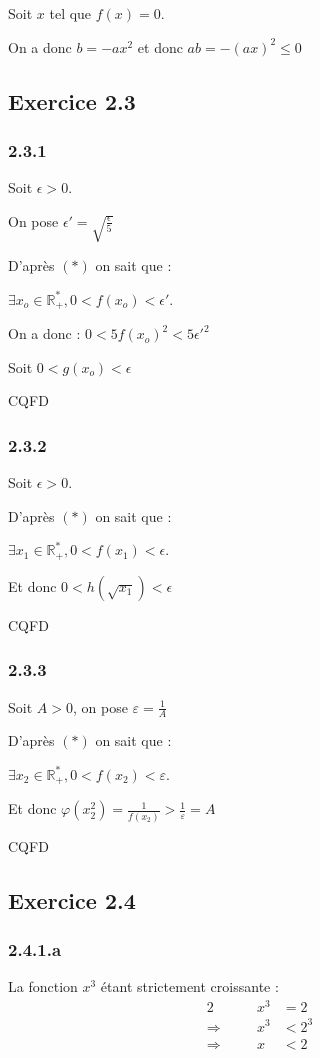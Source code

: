 \documentclass[a4paper,10pt]{report}
\begin{document}
Soit $x$ tel que $f(x) = 0$.

On a donc $b=-ax^2$ et donc $ab = -(ax)^2 \leq 0$


\subsection*{Exercice 2.3}
\subsubsection*{2.3.1}

Soit $\epsilon > 0$.

On pose $\epsilon' = \sqrt{\frac{\epsilon}{5}}$

D'après $(*)$ on sait que :

$\exists x_o \in \mathbb{R}^*_+, 0<f(x_o)<\epsilon'$.

On a donc : $0 < 5f(x_o)^2 < 5\epsilon'^2$

Soit $0 < g(x_o) < \epsilon$

CQFD

\subsubsection*{2.3.2}

Soit $\epsilon > 0$.

D'après $(*)$ on sait que :

$\exists x_1 \in \mathbb{R}^*_+, 0<f(x_1)<\epsilon$.

Et donc $0 < h(\sqrt{x_1}) < \epsilon$

CQFD

\subsubsection*{2.3.3}

Soit $A > 0$, on pose $\varepsilon = \frac{1}{A}$

D'après $(*)$ on sait que :

$\exists x_2 \in \mathbb{R}^*_+, 0<f(x_2)<\varepsilon$.

Et donc $\varphi(x_2^2) = \frac{1}{f(x_2)} > \frac{1}{\varepsilon} = A$

CQFD


\subsection*{Exercice 2.4}
\subsubsection*{2.4.1.a}
La fonction $x^3$ étant strictement croissante :
\begin{alignat*}{2}
	               &\quad & x^3 &=2 \\
	\Longrightarrow&      & x^3 &< 2^3 \\
	\Longrightarrow&      &   x &< 2 
\end{alignat*}
\end{document}
